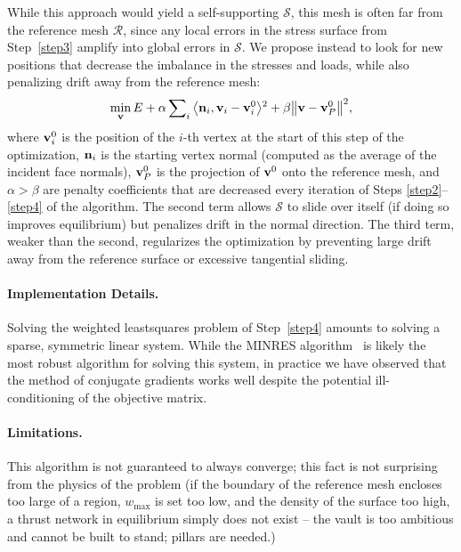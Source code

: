 \documentclass[review]{acmsiggraph}
\def\<{\mathchoice{\big\langle}{\langle}{\langle}{\langle}}
\def\>{\mathchoice{\big\rangle}{\rangle}{\rangle}{\rangle}}
\def\SS{{\mathcal S}}
\def\RR{{\mathcal R}}
\begin{document}
While this approach would yield a self-supporting $\SS$, this mesh is 
often far from the reference mesh $\RR$, since any local errors in the 
stress surface from Step~\ref{step3} amplify into global errors in $\SS$. 
We propose instead to look for new positions that decrease the imbalance 
in the stresses and loads, while also penalizing drift away from the 
reference mesh:
	\begin{align*}
	\min_{\vw} E
	+ \alpha \sum\nolimits_i
		\<\nw_i, \vw_i - \vw^0_i \>^2
		+ \beta \big\|\vw - \vw^0_P\big\|^2,
	\end{align*}
 where ${\mathbf v}^0_i$ is the position of the $i$-th vertex at the start of this 
step of the optimization, ${\mathbf n}_i$ is the starting vertex normal (computed 
as the average of the incident face normals), ${\mathbf v}^0_P$ is the projection 
of ${\mathbf v}^0$ onto the reference mesh, and $\alpha > \beta$ are penalty 
coefficients that are decreased every iteration of Steps 
\ref{step2}--\ref{step4} of the algorithm. The second term allows $\SS$ to 
slide over itself (if doing so improves equilibrium) but penalizes drift 
in the normal direction. The third term, weaker than the second, 
regularizes the optimization by preventing large drift away from the 
reference surface or excessive tangential sliding.

\paragraph{Implementation Details.}

Solving the weighted least\dash squares problem of Step~\ref{step4} 
amounts to solving a sparse, symmetric linear system. While the MINRES 
algorithm~\cite{paige75} is likely the most robust algorithm for solving 
this system, in practice we have observed that the method of conjugate 
gradients works well despite the potential ill-conditioning of the 
objective matrix. 

\paragraph{Limitations.}

This algorithm is not guaranteed to always converge; this fact is not 
surprising from the physics of the problem (if the boundary of the 
reference mesh encloses too large of a region, $w_{\max}$ is set too low, 
and the density of the surface too high, a thrust network in equilibrium 
simply does not exist -- the vault is too ambitious and cannot be built to 
stand; pillars are needed.)
\end{document}
